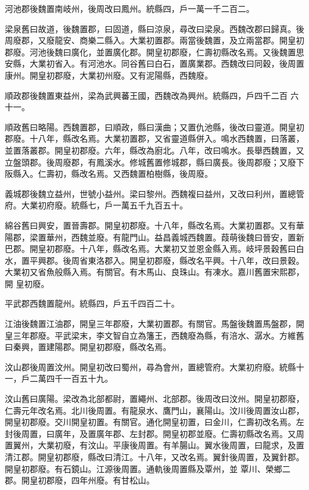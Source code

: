 \begin{pinyinscope}
 河池郡後魏置南岐州，後周改曰鳳州。統縣四，戶一萬一千二百二。



 梁泉舊曰故道，後魏置郡，曰固道，縣曰涼泉，尋改曰梁泉。西魏改郡曰歸真。後周廢郡，又廢龍安、商樂二縣入。大業初置郡。兩當後魏置，及立兩當郡。開皇初郡廢。河池後魏曰廣化，並置廣化郡。開皇初郡廢，仁壽初縣改名焉。又後魏置思安縣，大業初省入。有河池水。同谷舊曰白石，置廣業郡。西魏改曰同穀，後周置康州。開皇初郡廢，大業初州廢。又有泥陽縣，西魏廢。



 順政郡後魏置東益州，梁為武興蕃王國，西魏改為興州。統縣四，戶四千二百
 六十一。



 順政舊曰略陽。西魏置郡，曰順政，縣曰漢曲；又置仇池縣，後改曰靈道。開皇初郡廢。十八年，縣改名焉。大業初置郡，又省靈道縣併入。鳴水西魏置，曰落叢，並置落叢郡。開皇初郡廢。六年，縣改為廚北。八年，改曰鳴水。長舉西魏置，又立盤頭郡。後周廢郡，有鳳溪水。修城舊置修城郡，縣曰廣長。後周郡廢；又廢下阪縣入。仁壽初，縣改名焉。又西魏置柏樹縣，後周廢。



 義城郡後魏立益州，世號小益州。梁曰黎州。西魏複曰益州，又改曰利州，置總管府。大業初府廢。統縣七，戶一萬五千九百五十。



 綿谷舊曰興安，置晉壽郡。開皇初郡廢。十八年，縣改名焉。大業初置郡。又有華陽郡，梁置華州，西魏並廢。有龍門山。益昌義城西魏置。葭萌後魏曰晉安，置新巴郡。開皇初郡廢。十八年，縣改名焉。大業初又並恩金縣入焉。岐坪景穀舊曰白水，置平興郡。後周省東洛郡入。開皇初郡廢，縣改名平興。十八年，改曰景穀。大業初又省魚般縣入焉。有關官。有木馬山、良珠山。有凍水。嘉川舊置宋熙郡，開
 皇初廢。



 平武郡西魏置龍州。統縣四，戶五千四百二十。



 江油後魏置江油郡，開皇三年郡廢，大業初置郡。有關官。馬盤後魏置馬盤郡，開皇三年郡廢。平武梁末，李文智自立為籓王，西魏廢為縣，有涪水、潺水。方維舊曰秦興，置建陽郡。開皇初郡廢，縣改名焉。



 汶山郡後周置汶州。開皇初改曰蜀州，尋為會州，置總管府。大業初府廢。統縣十一，戶二萬四千一百五十九。



 汶山舊曰廣陽。梁改為北部都尉，置繩州、北部郡。後周改曰汶州。開皇初郡廢，仁壽元年改名焉。北川後周置。有龍泉水、鷹門山，襄陽山。汶川後周置汝山郡，開皇初郡廢。交川開皇初置。有關官。通化開皇初置，曰金川，仁壽初改名焉。左封後周置，曰廣年，及置廣年郡、左封郡。開皇初郡並廢。仁壽初縣改名焉。又周置翼州，大業初廢，有汶山。平康後周置。有羊腸山。翼水後周置，曰龍求，及置清江郡。開皇初郡廢，縣改曰清江。十八年，又改名焉。翼針後周置，及翼針郡。開皇初郡廢。有石鏡山。江源後周置。通軌後周置縣及覃州，並
 覃川、榮鄉二郡。開皇初郡廢，四年州廢。有甘松山。




\end{pinyinscope}
